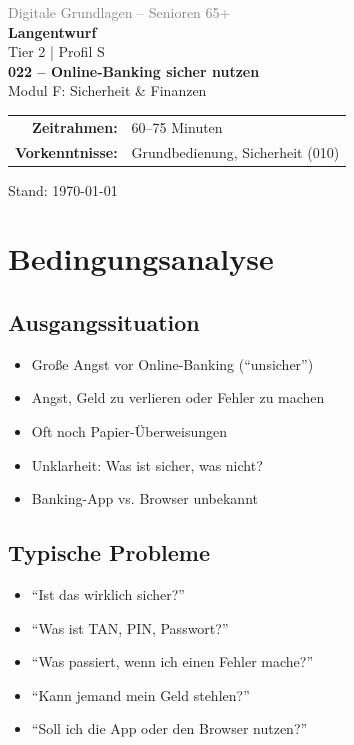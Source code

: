 \documentclass[11pt,a4paper]{article}
\begin{document}
\begin{titlepage}
    \centering
    \vspace*{2cm}
    {\Large\textcolor{gray}{Digitale Grundlagen -- Senioren 65+}}\\[2cm]
    {\Huge\textcolor{fach}{\textbf{Langentwurf}}}\\[0.5cm]
    {\large Tier 2 | Profil S}\\[2cm]
    {\LARGE\textbf{022 -- Online-Banking sicher nutzen}}\\[0.5cm]
    {\large Modul F: Sicherheit \& Finanzen}\\[2cm]
    \begin{tabular}{rl}
        \textbf{Zeitrahmen:} & 60--75 Minuten \\
        \textbf{Vorkenntnisse:} & Grundbedienung, Sicherheit (010) \\
    \end{tabular}
    \vfill
    {\normalsize Stand: \today}
\end{titlepage}

\tableofcontents
\newpage

\section{Bedingungsanalyse}

\subsection{Ausgangssituation}
\begin{itemize}
    \item Große Angst vor Online-Banking (``unsicher'')
    \item Angst, Geld zu verlieren oder Fehler zu machen
    \item Oft noch Papier-Überweisungen
    \item Unklarheit: Was ist sicher, was nicht?
    \item Banking-App vs. Browser unbekannt
\end{itemize}

\subsection{Typische Probleme}
\begin{itemize}
    \item ``Ist das wirklich sicher?''
    \item ``Was ist TAN, PIN, Passwort?''
    \item ``Was passiert, wenn ich einen Fehler mache?''
    \item ``Kann jemand mein Geld stehlen?''
    \item ``Soll ich die App oder den Browser nutzen?''
\end{itemize}
\end{document}
